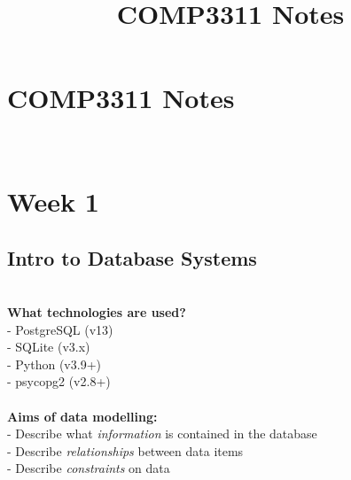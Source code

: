 \documentclass{article}
\title{COMP3311 Notes}
\begin{document}
\section*{\huge COMP3311 Notes}
~\\
\section{Week 1}
\subsection{Intro to Database Systems}
~\\
\textbf{What technologies are used?} \\
- PostgreSQL (v13) \\
- SQLite (v3.x) \\
- Python (v3.9+) \\
- psycopg2 (v2.8+) 
\\\\
\textbf{Aims of data modelling:} \\
- Describe what \emph{information} is contained in the database \\
- Describe \emph{relationships} between data items \\
- Describe \emph{constraints} on data
\end{document}
